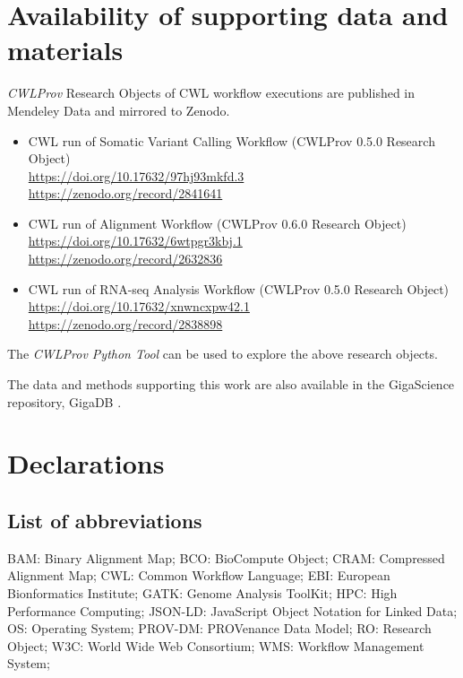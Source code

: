 \documentclass[a4paper,num-refs]{oup-contemporary}
\begin{document}
\section{Availability of supporting data and materials}

\textit{CWLProv} Research Objects of CWL workflow executions are published in Mendeley Data and mirrored to Zenodo.

\begin{itemize}
    \item \begin{sloppypar}
    CWL run of Somatic Variant Calling Workflow (CWLProv 0.5.0 Research Object) 
      \citep{somatic_mendeley}  \\
      \url{https://doi.org/10.17632/97hj93mkfd.3} \\
      \url{https://zenodo.org/record/2841641}
    \end{sloppypar}
    \item \begin{sloppypar}
    CWL run of Alignment Workflow (CWLProv 0.6.0 Research Object)
      \citep{alignment_mendeley} \\
      \url{https://doi.org/10.17632/6wtpgr3kbj.1} \\
      \url{https://zenodo.org/record/2632836}
    \end{sloppypar}
    \item \begin{sloppypar}
        CWL run of RNA-seq Analysis Workflow (CWLProv 0.5.0 Research Object)
        \citep{rnaseq_mendeley} \\
        \url{https://doi.org/10.17632/xnwncxpw42.1} \\
        \url{https://zenodo.org/record/2838898}
    \end{sloppypar}
\end{itemize}


The \textit{CWLProv Python Tool} can be used to explore the above research objects.

The data and methods supporting this work are also available in the GigaScience repository, GigaDB \citep{GigaScienceData}.

\section{Declarations}

\subsection{List of abbreviations}
BAM: Binary Alignment Map; BCO: BioCompute Object; CRAM: Compressed Alignment Map; CWL: Common Workflow Language; EBI: European Bionformatics Institute; GATK: Genome Analysis ToolKit; HPC: High Performance Computing; JSON-LD: JavaScript Object Notation for Linked Data; OS: Operating System; PROV-DM: PROVenance Data Model; RO: Research Object; W3C: World Wide Web Consortium; WMS: Workflow Management System;     
\end{document}
